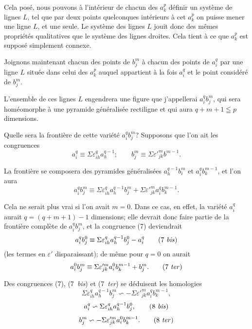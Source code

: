 \documentclass{article}
\begin{document}
Cela posé, nous pouvons à l'intérieur de chacun des $a^{p}_{k}$ définir un système de lignes $L$, tel que par deux points quelconques intérieurs à cet $a^{p}_{k}$ on puisse mener une ligne $L$, et une seule. Le système des lignes $L$ jouit donc des mêmes propriétés qualitatives que le système des lignes droites. Cela tient à ce que $a^{p}_{k}$ est supposé simplement connexe.

Joignons maintenant chacun des points de $b^{m}_{j}$ à chacun des points de $a^{q}_{i}$ par une ligne $L$ située dans celui des $a^{p}_{k}$ auquel appartient à la fois $a^{q}_{i}$ et le point considéré de $b^{m}_{j}$.

L'ensemble de ces lignes $L$ engendrera une figure que j'appellerai $a^{q}_{i} b^{m}_{j}$, qui sera homéomorphe à une pyramide généralisée rectiligne et qui aura $q+m+1 \leqq p$ dimensions.

Quelle sera la frontière de cette variété $a^{q}_{i} b^{m}_{j}$? Supposons que l'on ait les congruences
\[ a^{q}_{i} \equiv \Sigma \varepsilon^{q}_{ih} a^{q-1}_{h}; \qquad b^{m}_{j} \equiv \Sigma \varepsilon'^{m}_{jk} b^{m-1}. \]

La frontière se composera des pyramides généralisées $a^{q-1}_{h} b^{m}_{i}$ et $a^{q}_{i} b^{m-1}_{k}$, et l'on aura
\[ a^{q}_{i} b^{m}_{j} \equiv \Sigma \varepsilon^{q}_{ih} a^{q-1}_{h} b^{m}_{j} + \Sigma \varepsilon'^{m}_{jk} a^{q}_{i} b^{m-1}_{k}. \tag{7} \]

Cela ne serait plus vrai si l'on avait $m = 0$. Dans ce cas, en effet, la variété $a^{q}_{i}$ aurait $q = (q+m+1)-1$ dimensions; elle devrait donc
faire partie de la frontière complète de $a^{q}_{i} b^{m}_{j}$, et la congruence (7) deviendrait
\[ a^{q}_{i} b^{0}_{j} \equiv \Sigma \varepsilon^{q}_{ih} a^{q-1}_{h} b^{0}_{j} - a^{q}_{i} \tag{7 \textit{bis}} \]
(les termes en $\varepsilon'$ disparaissant); de même pour $q = 0$ on aurait
\[ a^{0}_{i} b^{m}_{j} \equiv \Sigma \varepsilon'^{m}_{jk} a^{0}_{i} b^{m-1}_{k} + b^{m}_{j}. \tag{7 \textit{ter}} \]

Des congruences (7), (7~\emph{bis}) et (7~\emph{ter}) se déduisent les homologies
\[ \Sigma \varepsilon^{q}_{ih} a^{q-1}_{h} b^{m}_{j} \backsim -\Sigma \varepsilon'^{m}_{jk} a^{q}_{i} b^{m-1}_{k}, \tag{8} \]
\[ a^{q}_{i} \backsim \Sigma \varepsilon^{q}_{ih} a^{q-1}_{h} b^{0}_{j}, \tag{8 \textit{bis}} \]
\[ b^{m}_{j} \backsim -\Sigma \varepsilon'^{m}_{jk} a^{0}_{i} b^{m-1}_{k}. \tag{8 \textit{ter}} \]
\end{document}

